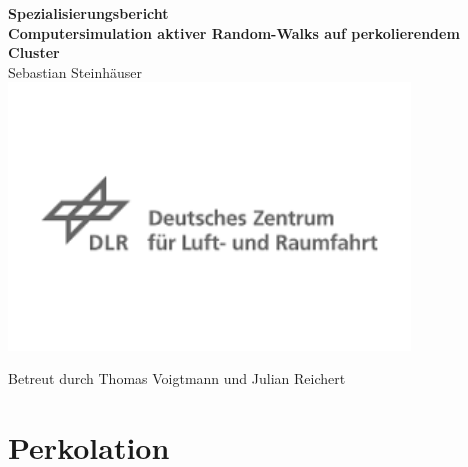\documentclass[a4paper, 12pt]{scrartcl}
\author{Sebastian Steinhäuser}
\begin{document}
\begin{center}
\Large{\textbf{Spezialisierungsbericht}}
\\
\vspace{1cm}
\Huge{\textbf{Computersimulation aktiver Random-Walks auf perkolierendem Cluster}}
\\
\vspace{1cm}
\Large{Sebastian Steinhäuser}
\includegraphics[width=0.8\textwidth]{DLR.png}
\end{center}
\begin{center}
Betreut durch Thomas Voigtmann und Julian Reichert
\end{center}
\newpage
\tableofcontents
\newpage
\section{Perkolation}
\end{document}
